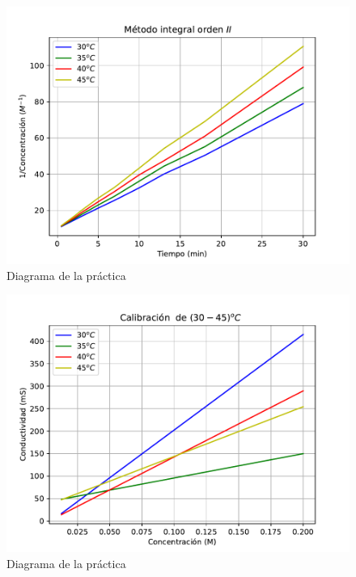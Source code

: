 \documentclass[12pt,letterpaper]{article}
\begin{document}







\begin{figure}[H]
         \centering
         \includegraphics[scale=1]{Figuras/concentracion_todos.pdf}
         \caption{Diagrama de la pr\'{a}ctica}
\end{figure}


\begin{figure}[H]
         \centering
         \includegraphics[scale=1]{Figuras/calibracion_todos.pdf}
         \caption{Diagrama de la pr\'{a}ctica}
\end{figure}
\end{document}
